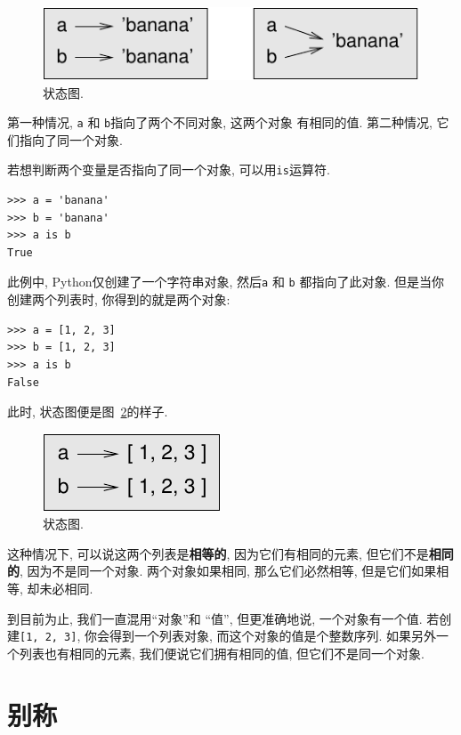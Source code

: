 \documentclass[10pt]{book}
\begin{document}
\begin{figure}
\centerline
{\includegraphics[scale=0.8]{figs/list1.pdf}}
\caption{状态图.}
\label{fig.list1}
\end{figure}

第一种情况, {\tt a} 和 {\tt b}指向了两个不同对象, 这两个对象
有相同的值. 第二种情况, 它们指向了同一个对象. 

若想判断两个变量是否指向了同一个对象, 可以用{\tt is}运算符.

\begin{verbatim}
>>> a = 'banana'
>>> b = 'banana'
>>> a is b
True
\end{verbatim}
%
此例中, Python仅创建了一个字符串对象, 然后{\tt a} 
和 {\tt b} 都指向了此对象. 
但是当你创建两个列表时, 你得到的就是两个对象:

\begin{verbatim}
>>> a = [1, 2, 3]
>>> b = [1, 2, 3]
>>> a is b
False
\end{verbatim}
%

此时, 状态图便是图~\ref{fig.list2}的样子.

\begin{figure}
\centerline
{\includegraphics[scale=0.8]{figs/list2.pdf}}
\caption{状态图.}
\label{fig.list2}
\end{figure}

这种情况下, 可以说这两个列表是{\bf 相等的},
因为它们有相同的元素, 
但它们不是{\bf 相同的}, 因为不是同一个对象. 
两个对象如果相同, 那么它们必然相等, 
但是它们如果相等, 却未必相同. 

到目前为止, 我们一直混用``对象''和 ``值'', 但更准确地说, 
一个对象有一个值. 若创建{\tt [1, 2, 3]}, 你会得到一个列表对象, 
而这个对象的值是个整数序列. 
如果另外一个列表也有相同的元素, 我们便说它们拥有相同的值, 
但它们不是同一个对象. 


\section{别称}
\end{document}
